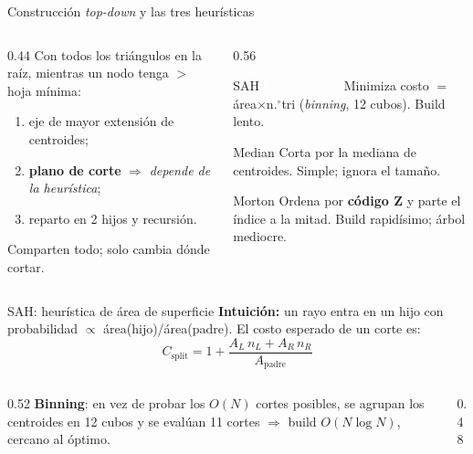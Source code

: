 \documentclass[aspectratio=169,11pt]{beamer}
\newcommand{\hl}[1]{{\color{primdk}\textbf{#1}}}
\begin{document}
\begin{frame}{Construcci\'on \emph{top-down} y las tres heur\'isticas}
\begin{columns}[c]
\begin{column}{0.44\textwidth}
\small Con todos los tri\'angulos en la ra\'iz, mientras un nodo tenga
$>$ hoja m\'inima:
\begin{enumerate}\itemsep1pt
  \item eje de mayor extensi\'on de centroides;
  \item \hl{plano de corte} $\Rightarrow$ \emph{depende de la heur\'istica};
  \item reparto en 2 hijos y recursi\'on.
\end{enumerate}
\vspace{3pt}
\centering\footnotesize\textcolor{mute}{Comparten todo; solo cambia \alert{d\'onde cortar}.}
\end{column}
\begin{column}{0.56\textwidth}
\begin{block}{SAH\hfill\textcolor{white}{$\bigstar$ mejor \'arbol}}
\footnotesize Minimiza costo $=$ \'area$\times$n.$^\circ$tri (\emph{binning}, 12 cubos). Build lento.
\end{block}
\begin{exampleblock}{Median}
\footnotesize Corta por la mediana de centroides. Simple; ignora el tama\~no.
\end{exampleblock}
\begin{block}{Morton}
\footnotesize Ordena por \hl{c\'odigo Z} y parte el \'indice a la mitad. Build rapid\'isimo; \'arbol mediocre.
\end{block}
\end{column}
\end{columns}
\end{frame}

\begin{frame}{SAH: heur\'istica de \'area de superficie}
\textbf{Intuici\'on:} un rayo entra en un hijo con probabilidad
$\propto$ \'area(hijo)/\'area(padre). El costo esperado de un corte es:
\[
C_{\text{split}} = 1 + \frac{A_L\,n_L + A_R\,n_R}{A_{\text{padre}}}
\]
\begin{columns}[c]
\begin{column}{0.52\textwidth}
\textbf{Binning}: en vez de probar los $O(N)$ cortes posibles, se agrupan los
centroides en \alert{12 cubos} y se eval\'uan 11 cortes $\Rightarrow$ build
$O(N\log N)$, cercano al \'optimo.
\end{column}
\begin{column}{0.48\textwidth}\centering
{}
\end{column}
\end{columns}
\end{frame}
\end{document}
